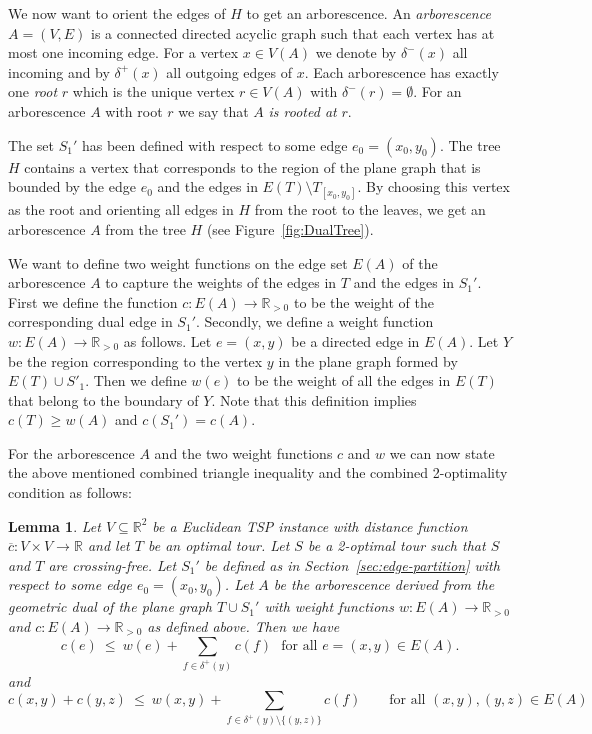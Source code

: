\documentclass[a4paper, 11pt]{article}
\newtheorem{lemma}[theorem]{Lemma}
\def\blue#1{#1}
\begin{document}
We now want to orient the edges of $H$ to get an arborescence.
An \emph{arborescence} $A=(V,E)$ is a connected directed acyclic graph \blue{such that each vertex has at most one incoming edge. For 
a vertex $x\in V(A)$ we denote by $\delta^-(x)$ all incoming and by $\delta^+(x)$ all outgoing edges of $x$.}
Each arborescence has exactly one \emph{root} $r$ which is the unique vertex $r\in V(A)$ with $\delta^-(r) = \emptyset$. 
For an arborescence $A$ with root $r$ we say that $A$ \emph{is rooted at} $r$.


The set $S_1'$ has been defined with respect to some edge $e_0=(x_0,y_0)$. 
The tree $H$ contains a vertex that corresponds to the region of the plane graph that is bounded by the edge $e_0$ and 
the edges in $E(T) \setminus  T_{[x_0,y_0]}$. By choosing this vertex as the root and orienting all edges in $H$ from the root to the leaves,
we get an arborescence $A$ from the tree $H$ (see Figure~\ref{fig:DualTree}).

We want to define two weight functions on the edge set $E(A)$ of the arborescence $A$ to capture the weights of the edges in $T$ and the
edges in $S_1'$. 
First we define the function $c:E(A) \to \mathbb{R}_{>0}$ to be the weight of the corresponding dual edge in $S_1'$.
Secondly, we define  a weight function $w:E(A) \to \mathbb{R}_{>0}$ as follows. Let $e=(x,y)$ be a directed edge in $E(A)$.
Let $Y$ be the region corresponding to the vertex $y$ in the plane graph formed by $E(T) \cup S'_1$. 
Then we define $w(e)$ to be the weight of all the edges in $E(T)$ that belong to the boundary of $Y$.
\blue{Note that this definition implies $c(T) \ge w(A)$ and $c(S_1') = c(A)$.}

For the arborescence $A$ and the two weight functions $c$ and $w$ we can now state the above mentioned combined triangle inequality 
and the combined 2-optimality condition as follows:



\begin{lemma}\label{lemma:main-property-of-S1'}
Let $V\subseteq \mathbb{R}^2$ be a Euclidean TSP instance with distance function $\overline c: V\times V \to \mathbb{R}$ and
let $T$ be an optimal tour. Let $S$ be a 2-optimal tour such that $S$ and $T$ are crossing-free. 
Let $S_1'$ be defined as in Section~\ref{sec:edge-partition} with respect to some edge $e_0=(x_0,y_0)$. 
Let $A$ be the arborescence derived from the geometric dual of the plane graph $T\cup S_1'$ with 
weight functions $w:E(A) \to \mathbb{R}_{>0}$
and $c:E(A) \to \mathbb{R}_{>0}$ as defined above. Then 
we have
\begin{equation}
c(e) ~\le~ w(e) + \sum_{f\in \delta^+(y)} c(f) ~~~\mbox{for all $e= (x,y)\in E(A)$} .
\label{eq:combined-triangle-inequality}
\end{equation}
and 
\begin{equation}
c(x,y) + c(y,z) ~\le~ w(x,y) + \sum_{f\in \delta^+(y)\setminus\{(y,z)\}} c(f) \mbox{~~~~~ for all } (x,y), (y,z) \in E(A) 
\label{eq:combined-2-optimality}
\end{equation} 
\end{lemma}
\end{document}
